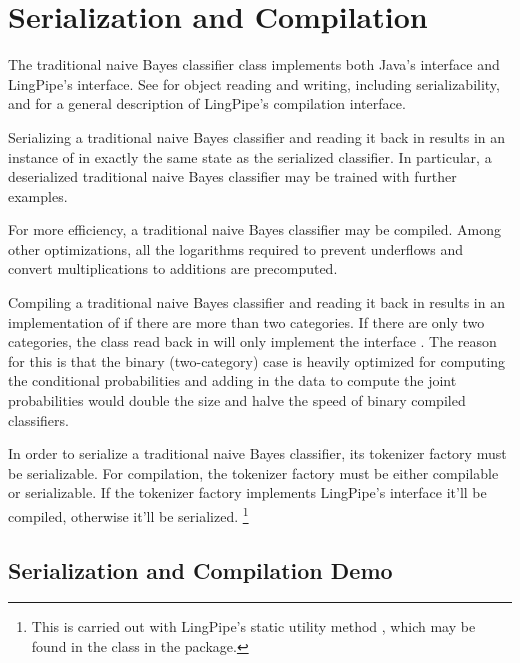 \section{Serialization and Compilation}

The traditional naive Bayes classifier class implements both Java's
 interface and LingPipe's 
interface.  See  for object reading and
writing, including serializability, and  for a
general description of LingPipe's compilation interface.

Serializing a traditional naive Bayes classifier and reading it
back in results in an instance of  in
exactly the same state as the serialized classifier.  In particular,
a deserialized traditional naive Bayes classifier may be trained
with further examples.  

For more efficiency, a traditional naive Bayes classifier may be
compiled.  Among other optimizations, all the logarithms required
to prevent underflows and convert multiplications to additions
are precomputed.  

Compiling a traditional naive Bayes classifier and reading it back in
results in an implementation of 
if there are more than two categories.  If there are only two
categories, the class read back in will only implement the interface
.  The reason for this is
that the binary (two-category) case is heavily optimized for computing
the conditional probabilities and adding in the data to compute the
joint probabilities would double the size and halve the speed of
binary compiled classifiers.

In order to serialize a traditional naive Bayes classifier, its
tokenizer factory must be serializable.  For compilation, the
tokenizer factory must be either compilable or serializable.  If
the tokenizer factory implements LingPipe's  interface
it'll be compiled, otherwise it'll be serialized.%
%
\footnote{This is carried out with LingPipe's static utility method
  , which may be found in the
   class in the 
  package.}

\subsection{Serialization and Compilation Demo}

